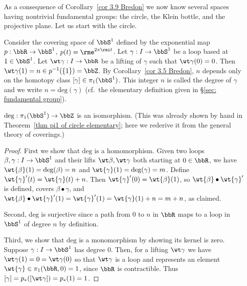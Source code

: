 As a consequence of Corollary~\ref{cor 3.9 Bredon} we now know several spaces having nontrivial fundamental groups: the circle, the Klein bottle, and the projective plane. Let us start with the circle.

\begin{defn}
    Consider the covering space of $\bbS^1$ defined by the exponential map $p:\bbR \to \bbS^1$, $p(t)=\rme^{2\pi\rmi t}$. Let $\gamma :I\to \bbS^1$ be a loop based at $1\in \bbS^1$. Let $\wt\gamma :I\to \bbR $ be a lifting of $\gamma$ such that $\wt\gamma(0)=0$. Then $\wt\gamma(1)=n\in p^{-1}(\{1\})=\bbZ$. By Corollary~\ref{cor 3.5 Bredon}, $n$ depends only on the homotopy class $[\gamma]\in\pi_1(\bbS^1)$. This integer $n$ is called the degree of $\gamma$ and we write $n=\mathrm{deg}(\gamma)$ (cf.\ the elementary definition given in \S\ref{sec: fundamental group}).
\end{defn}
\begin{thm}\label{pi_1 of the circle thm}
    $\mathrm{deg}: \pi_1(\bbS^1)\to \bbZ$ is an isomorphism. (This was already shown by hand in Theorem~\ref{thm pi1 of circle elementary}; here we rederive it from the general theory of coverings.)
\end{thm}
\begin{proof}
    First we show that $\mathrm{deg}$ is a homomorphism. Given two loops $\beta,\gamma:I\to \bbS^1$ and their lifts $\wt \beta,\wt\gamma$ both starting at $0\in\bbR $, we have $\wt{\beta}(1)=\mathrm{deg}(\beta)=n$ and  $\wt{\gamma}(1)=\mathrm{deg}(\gamma)=m$. Define $\wt{\gamma}'(t)=\wt{\gamma}(t)+n$. Then $\wt{\gamma}'(0)=\wt{\beta}(1)$, so $\wt{\beta}\bullet \wt{\gamma}'$ is defined, covers $\beta\bullet\gamma$, and $\wt{\beta}\bullet \wt{\gamma}'(1)=\wt{\gamma}'(1)=\wt{\gamma}(1)+n=m+n$, as claimed.

    Second, $\mathrm{deg}$ is surjective since a path from $0$ to $n$ in $\bbR $ maps to a loop in $\bbS^1$ of degree $n$ by definition.

    Third, we show that $\mathrm{deg}$ is a monomorphism by showing its kernel is zero. Suppose $\gamma:I\to \bbS^1$ has degree $0$. Then, for a lifting $\wt\gamma$ we have $\wt\gamma(1)=0=\wt\gamma(0)$ so that $\wt\gamma$ is a loop and represents an element $\wt{\gamma}\in\pi_1(\bbR ,0)=1$, since $\bbR $ is contractible. Thus $[\gamma]=p_\ast([\wt\gamma])=p_\ast (1)=1$.
\end{proof}


